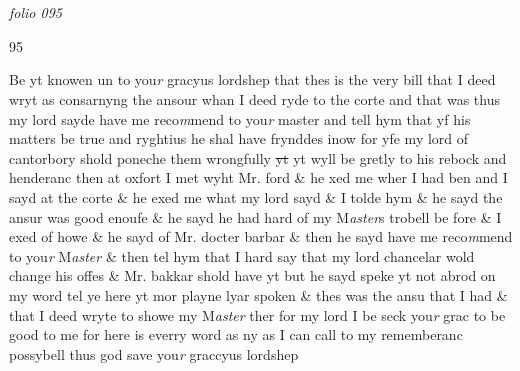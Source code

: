 \documentclass[12pt, a4paper]{book}
\begin{document}
            
            
\dotfill
						\newpage {} \subsection*{}  \subsection*{}  \section*{}

\textit{folio 095}



\begin{flushright}{\color{Mahogany}95}\end{flushright}

	
		\ifthenelse{\isodd{\thepage}}
		{\reversemarginpar}
		{\normalmarginpar}
		Be yt knowen un to you\textit{r} gracyus lordshep that thes is the very bill
 that I deed wryt as consarnyng the ansour whan I deed ryde
 to the corte and that was thus my lord sayde have me reco\textit{m}mend
 to you\textit{r} master and tell hym that yf his matters be true and ryghtius
		he shal have frynddes inow for yfe my lord of cantorbory shold
 poneche them wrongfully \sout{yt} yt wyll be gretly to his rebock
 and henderanc then at oxfort I met wyht Mr. ford \& he xed me
 wher I had ben and I sayd at the corte \& he exed me what my
 lord sayd \& I tolde hym \& he sayd the ansur was good enoufe \&
 he sayd he had hard of my M\textit{aster}s trobell be fore \& I exed of howe
 \& he sayd of Mr. docter barbar \& then he sayd have me reco\textit{m}mend
 to you\textit{r} M\textit{aster }\& then tel hym that I hard say that my lord
 chancelar wold change his offes \& Mr. bakkar shold have yt
			 but he sayd speke yt not
 abrod on my word tel ye here yt mor playne lyar spoken
 \& thes was the ansu that I had \& that I deed wryte
 to showe my M\textit{aster} ther for my lord I be seck you\textit{r} grac to be
 good to me for here is everry word as ny as I can call to
 my rememberanc possybell thus god save you\textit{r} graccyus
 lordshep

\dotfill
						\newpage
{}
\end{document}
